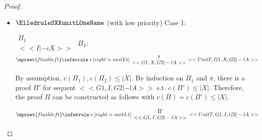 \begin{proof}
\begin{enumerate}
\begin{itemize}
  \item $\ElledruleSXXunitLOneName$ (with low priority) Case 1:
    \begin{center}
      \scriptsize
      \begin{math}
        \begin{array}{c}
          \Pi_1 \\
          {<<I |-c X>>}
        \end{array}
      \end{math}
      \qquad\qquad
      $\Pi_2$:
      \begin{math}
        $$\mprset{flushleft}
        \inferrule* [right={\tiny unitL1}] {
          {
            \begin{array}{c}
              \pi \\
              {<<G1, X, G2 |-l A>>}
            \end{array}
          }
        }{<<UnitT, G1, X, G2 |-l A>>}
      \end{math}
    \end{center}
    By assumption, $c(\Pi_1),c(\Pi_2)\leq |X|$. By induction on $\Pi_1$ and $\pi$, there is a
    proof $\Pi'$ for sequent $<<G1, I, G2 |-l A>>$ s.t. $c(\Pi') \leq |X|$. Therefore, the
    proof $\Pi$ can be constructed as follows with $c(\Pi) = c(\Pi') \leq |X|$.
    \begin{center}
      \scriptsize
      \begin{math}
        $$\mprset{flushleft}
        \inferrule* [right={\tiny unitL1}] {
          {
            \begin{array}{c}
              \Pi' \\
              {<<G1, I, G2 |-l A>>}
            \end{array}
          }
        }{<<UnitT, G1, I, G2 |-l A>>}
      \end{math}
    \end{center}


\end{itemize}
\end{enumerate}
\end{proof}

